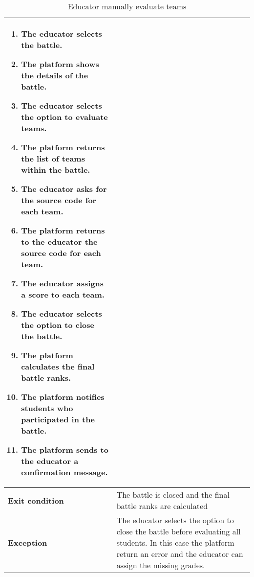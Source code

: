 \begin{enumerate}[label=\textbf{UC\arabic*}:,ref=UC\arabic*,leftmargin=1.3cm]
{\begin{table}[H]
\begin{tabular}{|l|p{11.9cm}|}
\begin{enumerate}[label=\arabic*.]
                              \item The educator selects the battle.
                              \item The platform shows the details of the battle.
                              \item The educator selects the option to evaluate teams.
                              \item The platform returns the list of teams within the battle.
                              \item The educator asks for the source code for each team.
                              \item The platform returns to the educator the source code for each team.
                              \item The educator assigns a score to each team.
                              \item The educator selects the option to close the battle.
                              \item The platform calculates the final battle ranks.
                              \item The platform notifies students who participated in the battle.
                              \item The platform sends to the educator a confirmation message.
                        \end{enumerate}                 \\\hline
                        \textbf{Exit condition}  & The battle is closed and the final battle ranks are calculated                      \\\hline
                        \textbf{Exception}       & The educator selects the option to close the battle before evaluating all students.
                        In this case the platform return an error and the educator can assign the missing grades.                      \\\hline
                  \end{tabular}
                  \caption{Educator manually evaluate teams    }
                  \label{table:Educator manually evaluate teams    }
            \end{table}
            \begin{adjustbox}{
                        max size={\textwidth}{},
}
\end{adjustbox}}
\end{enumerate}
